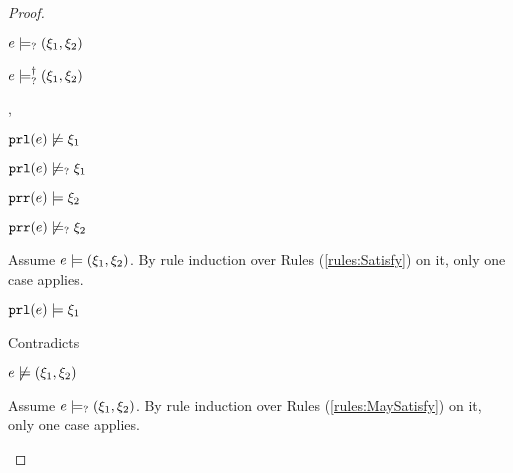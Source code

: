 \begin{proof}
\begin{byCases}
\begin{byCases}
\begin{byCases}
\begin{byCases}
\begin{pfsteps*}
                \item $e \models_{?} (\xi_1 , \xi_2)$  
                \item $e \models_{?}^{\dag} (\xi_1 , \xi_2)$ 
                \end{pfsteps*}
            \end{byCases}
        \item[\cnotsatisfyormay{\hprl{e}}{\xi_1},\csatisfy{\hprr{e}}{\xi_2}]
            \begin{pfsteps*}
            \item $\mathtt{prl}(e) \not\models \xi_1$  
            \item $\mathtt{prl}(e) \not\models_{?} \xi_1$  
            \item $\mathtt{prr}(e) \models \xi_2$  
            \item $\mathtt{prr}(e) \not\models_{?} \xi_2$  
            \end{pfsteps*}
            Assume $e \models (\xi_1 , \xi_2)$. By rule induction over Rules (\ref{rules:Satisfy}) on it, only one case applies.
            \begin{byCases}
            \item[\text{(\ref{rule:CSNotValPair})}]
                \begin{pfsteps*}
                \item $\mathtt{prl}(e) \models \xi_1$ 
                \end{pfsteps*}
                Contradicts 
            \end{byCases}
            \begin{pfsteps*}
            \item $e \not\models (\xi_1 , \xi_2)$  
            \end{pfsteps*}
            Assume $e \models_{?} (\xi_1 , \xi_2)$. By rule induction over Rules (\ref{rules:MaySatisfy}) on it, only one case applies.
            \begin{byCases}
            \item[\text{(\ref{rule:CMSNotVal})}]
                \begin{pfsteps*}

\end{pfsteps*}
\end{byCases}
\end{byCases}
\end{byCases}
\end{byCases}
\end{proof}
